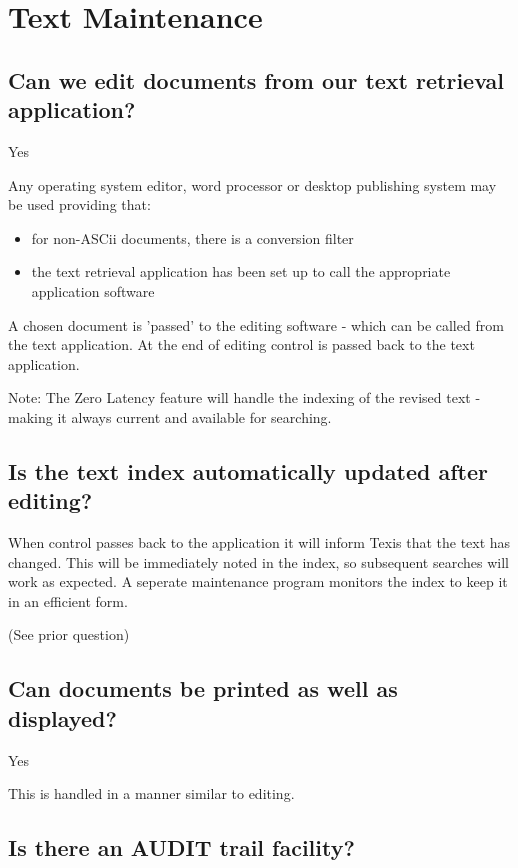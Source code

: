 \section{Text Maintenance}

\subsection{Can we edit documents from our text retrieval application?}

Yes

Any operating system editor, word processor or desktop publishing system
may be used providing that:
\begin{itemize}
 \item  for non-ASCii documents, there is a conversion
filter

 \item  the text retrieval application has been set up to call the
appropriate application software
\end{itemize}
A chosen document is 'passed' to the editing software - which can be
called from the text application.  At the end of editing control is passed
back to the text application.

Note:  The Zero Latency feature will handle the indexing of the revised
text -  making it always current and available for searching.

\subsection{Is the text index automatically updated after editing?}

When control passes back to the application it will inform Texis that
the text has changed.  This will be immediately noted in the index, so
subsequent searches will work as expected.  A seperate maintenance
program monitors the index to keep it in an efficient form.

(See prior question)

\subsection{Can documents be printed as well as displayed?}

Yes

This is handled in a manner similar to editing.

\subsection{Is there an AUDIT trail facility?}

